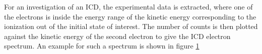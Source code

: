 For an investigation of an ICD, the experimental data is extracted,
where one of the
electrons is inside the energy range of the kinetic energy
corresponding to the ionization out of
the initial state of interest. The number of counts is then plotted
against the kinetic energy of the second electron to give the ICD electron
spectrum. An example for such a spectrum is shown in
figure \ref{figure:ICD_spectrum_example}


\begin{figure}[h]
  \centering
  \caption{}
  \label{figure:ICD_spectrum_example}
\end{figure}
